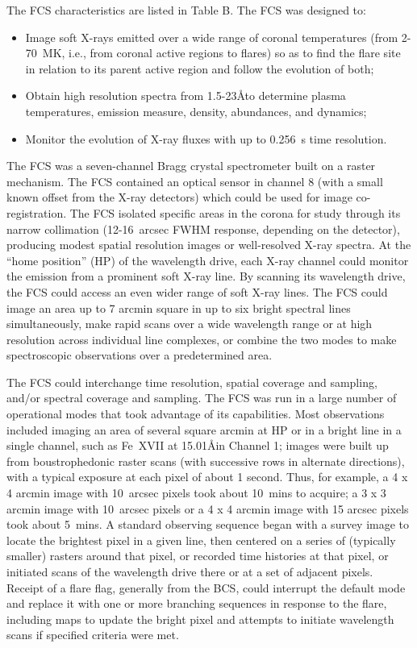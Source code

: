The FCS characteristics are listed in Table B. The FCS was designed to:
\begin{itemize}
\item	 Image soft X-rays emitted over a wide range of coronal 
	  temperatures (from 2-70~MK, i.e., from coronal active regions to
	  flares) so as to find the flare site in relation to its parent active
	  region and follow the evolution of both;

\item	 Obtain high resolution spectra from 1.5-23\AA to determine plasma 
	  temperatures, emission measure, density, abundances, and dynamics;

\item	 Monitor the evolution of X-ray fluxes with up to 0.256~s time 
          resolution.
\end{itemize}
 
The FCS was a seven-channel Bragg crystal spectrometer built on a raster
mechanism. The FCS contained an optical sensor in channel 8 (with a small known
offset from the X-ray detectors) which could be used for image co-registration.
The FCS isolated specific areas in the corona for study through its narrow
collimation  (12-16~arcsec FWHM response, depending on the detector), 
producing modest spatial resolution images or well-resolved X-ray spectra. At
the ``home position'' (HP) of the wavelength drive, each X-ray channel could
monitor the emission from a prominent soft X-ray line. By scanning its
wavelength drive, the FCS could access an even wider range of soft X-ray lines.
The FCS could image an area up to 7 arcmin square in up to six bright spectral
lines simultaneously, make rapid scans over a wide wavelength range or at high
resolution across individual line complexes, or combine the two modes to make
spectroscopic observations over a predetermined area. 

The FCS could interchange time resolution, spatial coverage and sampling,
and/or spectral coverage and sampling. The FCS was run in a large number of
operational modes that took advantage of its capabilities.  Most observations
included imaging an area of several square arcmin at HP or in a bright line in
a single channel, such as Fe~XVII at 15.01\AA in Channel 1; images were built
up  from boustrophedonic raster scans (with successive rows in alternate 
directions), with a typical exposure at each pixel of about 1 second. Thus, 
for example, a 4 x 4 arcmin image with 10~arcsec pixels took about 10~mins to
acquire; a 3 x 3 arcmin image with 10~arcsec pixels or a 4 x 4 arcmin image
with 15 arcsec pixels took about 5~mins.  A standard observing sequence began
with a survey image to locate the brightest pixel in a given line, then
centered on a series of (typically smaller) rasters around that pixel, or
recorded time histories at that pixel, or initiated scans of the wavelength
drive there or at a set of adjacent pixels. Receipt of a flare flag, generally
from the BCS, could interrupt the default mode and replace it with one or more
branching sequences in response to the flare, including maps to update the
bright pixel and attempts to initiate wavelength scans if specified criteria
were met. 

